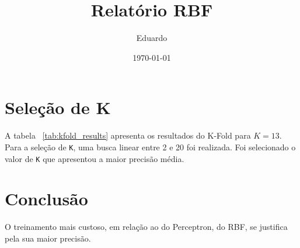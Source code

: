 \documentclass[a4paper,12pt]{article}
\begin{document}
\title{Relatório RBF}
\author{Eduardo}
\date{\today}
\maketitle

\section*{Seleção de K}

A tabela ~\ref{tab:kfold_results} apresenta os resultados do K-Fold para $K = 13$. Para a seleção de \texttt{K}, uma busca linear entre 2 e 20 foi realizada. Foi selecionado o valor de \texttt{K} que apresentou a maior precisão média.

\begin{table}[H]
  \centering
  \caption{Resultados do K-Fold para $K = 13$}
  \label{tab:kfold_results}
\end{table}

\section*{Conclusão}

O treinamento mais custoso, em relação ao do Perceptron, do RBF, se justifica pela sua maior precisão.
\end{document}
